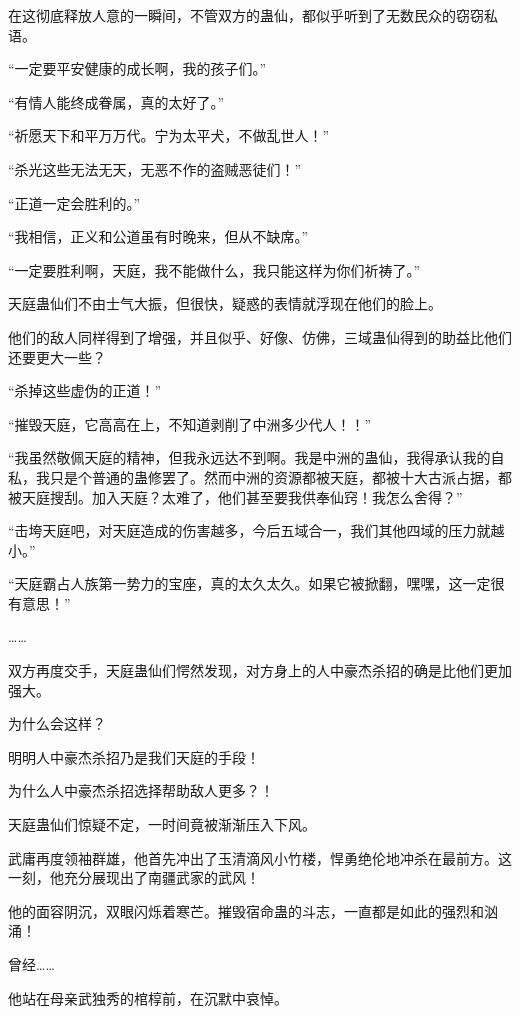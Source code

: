 
\begin{this_body}

在这彻底释放人意的一瞬间，不管双方的蛊仙，都似乎听到了无数民众的窃窃私语。

“一定要平安健康的成长啊，我的孩子们。”

“有情人能终成眷属，真的太好了。”

“祈愿天下和平万万代。宁为太平犬，不做乱世人！”

“杀光这些无法无天，无恶不作的盗贼恶徒们！”

“正道一定会胜利的。”

“我相信，正义和公道虽有时晚来，但从不缺席。”

“一定要胜利啊，天庭，我不能做什么，我只能这样为你们祈祷了。”

天庭蛊仙们不由士气大振，但很快，疑惑的表情就浮现在他们的脸上。

他们的敌人同样得到了增强，并且似乎、好像、仿佛，三域蛊仙得到的助益比他们还要更大一些？

“杀掉这些虚伪的正道！”

“摧毁天庭，它高高在上，不知道剥削了中洲多少代人！！”

“我虽然敬佩天庭的精神，但我永远达不到啊。我是中洲的蛊仙，我得承认我的自私，我只是个普通的蛊修罢了。然而中洲的资源都被天庭，都被十大古派占据，都被天庭搜刮。加入天庭？太难了，他们甚至要我供奉仙窍！我怎么舍得？”

“击垮天庭吧，对天庭造成的伤害越多，今后五域合一，我们其他四域的压力就越小。”

“天庭霸占人族第一势力的宝座，真的太久太久。如果它被掀翻，嘿嘿，这一定很有意思！”

……

双方再度交手，天庭蛊仙们愕然发现，对方身上的人中豪杰杀招的确是比他们更加强大。

为什么会这样？

明明人中豪杰杀招乃是我们天庭的手段！

为什么人中豪杰杀招选择帮助敌人更多？！

天庭蛊仙们惊疑不定，一时间竟被渐渐压入下风。

武庸再度领袖群雄，他首先冲出了玉清滴风小竹楼，悍勇绝伦地冲杀在最前方。这一刻，他充分展现出了南疆武家的武风！

他的面容阴沉，双眼闪烁着寒芒。摧毁宿命蛊的斗志，一直都是如此的强烈和汹涌！

曾经……

他站在母亲武独秀的棺椁前，在沉默中哀悼。


\end{this_body}
